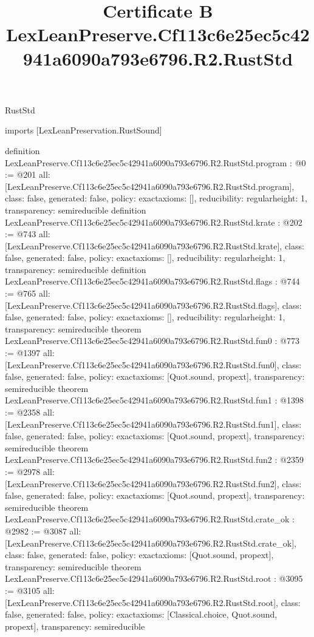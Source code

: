 \begin{lexlean}{RustStd}
\title{Certificate B LexLeanPreserve.Cf113c6e25ec5c42941a6090a793e6796.R2.RustStd}
\begin{coremodule}
imports [LexLeanPreservation.RustSound]

definition LexLeanPreserve.Cf113c6e25ec5c42941a6090a793e6796.R2.RustStd.program : @0 := @201 {
  all: [LexLeanPreserve.Cf113c6e25ec5c42941a6090a793e6796.R2.RustStd.program],
  class: false,
  generated: false,
  policy: exact{axioms: []},
  reducibility: regular{height: 1},
  transparency: semireducible
}
definition LexLeanPreserve.Cf113c6e25ec5c42941a6090a793e6796.R2.RustStd.krate : @202 := @743 {
  all: [LexLeanPreserve.Cf113c6e25ec5c42941a6090a793e6796.R2.RustStd.krate],
  class: false,
  generated: false,
  policy: exact{axioms: []},
  reducibility: regular{height: 1},
  transparency: semireducible
}
definition LexLeanPreserve.Cf113c6e25ec5c42941a6090a793e6796.R2.RustStd.flags : @744 := @765 {
  all: [LexLeanPreserve.Cf113c6e25ec5c42941a6090a793e6796.R2.RustStd.flags],
  class: false,
  generated: false,
  policy: exact{axioms: []},
  reducibility: regular{height: 1},
  transparency: semireducible
}
theorem LexLeanPreserve.Cf113c6e25ec5c42941a6090a793e6796.R2.RustStd.fun0 : @773 := @1397 {
  all: [LexLeanPreserve.Cf113c6e25ec5c42941a6090a793e6796.R2.RustStd.fun0],
  class: false,
  generated: false,
  policy: exact{axioms: [Quot.sound, propext]},
  transparency: semireducible
}
theorem LexLeanPreserve.Cf113c6e25ec5c42941a6090a793e6796.R2.RustStd.fun1 : @1398 := @2358 {
  all: [LexLeanPreserve.Cf113c6e25ec5c42941a6090a793e6796.R2.RustStd.fun1],
  class: false,
  generated: false,
  policy: exact{axioms: [Quot.sound, propext]},
  transparency: semireducible
}
theorem LexLeanPreserve.Cf113c6e25ec5c42941a6090a793e6796.R2.RustStd.fun2 : @2359 := @2978 {
  all: [LexLeanPreserve.Cf113c6e25ec5c42941a6090a793e6796.R2.RustStd.fun2],
  class: false,
  generated: false,
  policy: exact{axioms: [Quot.sound, propext]},
  transparency: semireducible
}
theorem LexLeanPreserve.Cf113c6e25ec5c42941a6090a793e6796.R2.RustStd.crate_ok : @2982 := @3087 {
  all: [LexLeanPreserve.Cf113c6e25ec5c42941a6090a793e6796.R2.RustStd.crate_ok],
  class: false,
  generated: false,
  policy: exact{axioms: [Quot.sound, propext]},
  transparency: semireducible
}
theorem LexLeanPreserve.Cf113c6e25ec5c42941a6090a793e6796.R2.RustStd.root : @3095 := @3105 {
  all: [LexLeanPreserve.Cf113c6e25ec5c42941a6090a793e6796.R2.RustStd.root],
  class: false,
  generated: false,
  policy: exact{axioms: [Classical.choice, Quot.sound, propext]},
  transparency: semireducible
}


\end{coremodule}
\end{lexlean}
